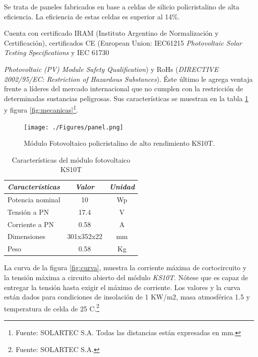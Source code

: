 Se trata de paneles fabricados en base a celdas de silicio policristalino de alta eficiencia. La eficiencia de estas celdas es superior al 14\%.

Cuenta con certificado IRAM (Instituto Argentino de Normalización y Certificación), certificados CE (European Union: IEC61215 \textit{Photovoltaic Solar Testing Specifications} y IEC 61730 {\textit{Photovoltaic (PV) Module Safety Qualification}) y RoHs (\textit{DIRECTIVE 2002/95/EC: Restriction of Hazardous Substances}). Éste último le agrega ventaja frente a líderes del mercado internacional que no cumplen con la restricción de determinadas sustancias peligrosas. Sus características se muestran en la tabla \ref{tab:ks10t} y figura \ref{fig:mecanicas}\footnote{Fuente: SOLARTEC S.A. Todas las distancias están expresadas en mm.}.

 \begin{figure}[h!]
	\centering
    \texttt{[image: ./Figures/panel.png]}
    	\caption{Módulo Fotovoltaico policristalino de alto rendimiento KS10T.}
	\label{fig:ks10t}
\end{figure}

\vspace{10px}

\begin{table}[ht]
	\centering
	\caption{Características del módulo fotovoltaico KS10T}
	\begin{tabular}{@{} l *2c @{}}    \toprule
		\emph{\textbf{Características}} & \emph{\textbf{Valor}} & \emph{\textbf{Unidad}}\\
		\midrule
		Potencia nominal	& 10 	& Wp	\\	
		Tensión a PN		& 17.4	& V\\
		Corriente a PN	& 0.58		& A\\
		Dimensiones		& 301x352x22 	& mm\\
		Peso				& 0.58		& Kg	\\
		\bottomrule
		\hline
	\end{tabular}
	\label{tab:ks10t}
\end{table}

La curva de la figura \ref{fig:curva}, muestra la corriente máxima de cortocircuito y la tensión máxima a circuito abierto del módulo \textit{KS10T}. Nótese que es capaz de entregar la tensión hasta exigir el máximo de corriente. Los valores y la curva están dados para condiciones de insolación de 1 KW/m2, masa atmosférica 1.5 y temperatura de celda de 25 \grados C.\footnote{Fuente: SOLARTEC S.A.}

}
